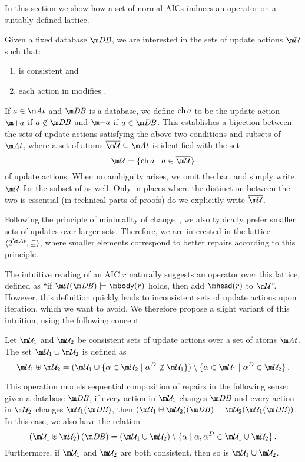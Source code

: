 In this section we show how a set of normal AICs induces an operator on a suitably defined lattice.


Given a fixed database $\db$, we are interested in the sets of update actions $\UU$ such that:
\begin{enumerate}
\item \UU is consistent and 
\item each action in \UU modifies \db.
\end{enumerate}
If $a\in \atoms$ and $\db$ is a database, we define $\operatorname{ch} a$ to be the update action $\add a$ if $a\not\in \db$ and $\remove a$ if $a \in \db$.
This establishes a bijection between the sets of update actions satisfying the above two conditions and subsets of $\atoms$, where a set of atoms $\overline\UU\subseteq\atoms$ is identified with the set 
\[\UU = \{\change a\mid a \in \overline \UU \}\]
of update actions.
When no ambiguity arises, we omit the bar, and simply write $\UU$ for the subset of \atoms as well.
Only in places where the distinction between the two is essential (in technical parts of proofs) do we explicitly write $\overline\UU$.

Following the principle of minimality of change~\cite{Winslett90,ai/EiterG92}, we also typically prefer smaller sets of updates over larger sets.
Therefore, we are interested in the lattice $\langle 2^{\atoms},\subseteq\rangle$, where smaller elements correspond to better repairs according to this principle.

The intuitive reading of an AIC $r$ naturally suggests an operator over this lattice, defined as ``if $\UU(\db)\models\body(r)$ holds, then add $\head(r)$ to $\UU$''.
However, this definition quickly leads to inconsistent sets of update actions upon iteration, which we want to avoid.
We therefore propose a slight variant of this intuition, using the following concept.

\begin{definition}
  Let $\UU_1$ and $\UU_2$ be consistent sets of update actions over a set of atoms $\atoms$.
  The set $\UU_1\uplus\UU_2$ is defined as
  \[\UU_1\uplus\UU_2 = (\UU_1\cup\{\alpha\in\UU_2\mid\alpha^D\not\in\UU_1\})\setminus\{\alpha\in\UU_1\mid\alpha^D\in\UU_2\}\,.\]
\end{definition}
This operation models sequential composition of repairs in the following sense: given a database $\db$, if every action in $\UU_1$ changes $\db$ and every action in $\UU_2$ changes $\UU_1(\db)$, then $(\UU_1\uplus\UU_2)(\db)=\UU_2(\UU_1(\db))$.
In this case, we also have the relation
\[\left(\UU_1\uplus \UU_2\right)(\db) = \left(\UU_1\cup \UU_2\right) \setminus \{\alpha \mid \alpha,\alpha^D\in \UU_1\cup\UU_2\}\,.\]
Furthermore, if $\UU_1$ and $\UU_2$ are both consistent, then so is $\UU_1\uplus\UU_2$.

